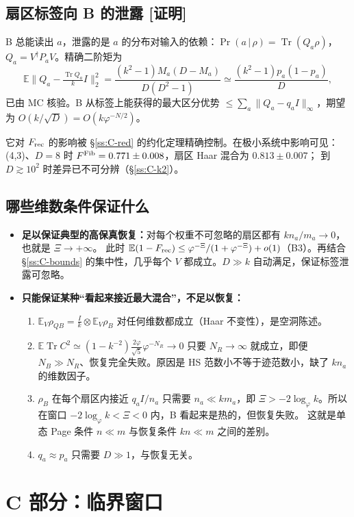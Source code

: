 \documentclass[11pt,a4paper,UTF8]{ctexart}
\newcommand{\Tr}{\operatorname{Tr}}
\newcommand{\E}{\mathbb{E}}
\newcommand{\Frec}{F_{\rm rec}}
\newcommand{\tagP}{\texorpdfstring{\textcolor{cP}{\textbf{[证明]}}}{[证明]}}
\begin{document}
\subsection{扇区标签向 B 的泄露 \tagP}\label{ss:B-leak}
B 总能读出 $a$，泄露的是 $a$ 的分布对输入的依赖：$\Pr(a\,|\,\rho)=\Tr(Q_a\rho)$，$Q_a=V^\dagger P_aV$。精确二阶矩为
\[
\E\Big\|Q_a-\tfrac{\Tr Q_a}{k}I\Big\|_2^2=\frac{(k^2-1)M_a(D-M_a)}{D(D^2-1)}\simeq\frac{(k^2-1)p_a(1-p_a)}{D},
\]
已由 MC 核验。B 从标签上能获得的最大区分优势 $\le\sum_a\|Q_a-q_aI\|_\infty$，期望为 $O(k/\sqrt D)=O(k\varphi^{-N/2})$。

它对 $\Frec$ 的影响被 \S\ref{ss:C-red} 的约化定理精确控制。在极小系统中影响可见：(4,3)、$D=8$ 时 $F^{\rm Fib}=0.771\pm0.008$，扇区 Haar 混合为 $0.813\pm0.007$；
到 $D\gtrsim10^2$ 时差异已不可分辨（\S\ref{ss:C-k2}）。

\subsection{哪些维数条件保证什么}\label{ss:B-dims}
\begin{itemize}
  \item \textbf{足以保证典型的高保真恢复：}对每个权重不可忽略的扇区都有 $kn_a/m_a\to0$，也就是 $\Xi\to+\infty$。
  此时 $\E(1-\Frec)\le\varphi^{-\Xi}/(1+\varphi^{-\Xi})+o(1)$（B3）。再结合 \S\ref{ss:C-bounds} 的集中性，几乎每个 $V$ 都成立。$D\gg k$ 自动满足，保证标签泄露可忽略。
  \item \textbf{只能保证某种“看起来接近最大混合”，不足以恢复：}
  \begin{enumerate}
    \item $\E_V\rho_{QB}=\frac Ik\otimes\E_V\rho_B$ 对任何维数都成立（Haar 不变性），是空洞陈述。
    \item $\E\Tr C^2\simeq(1-k^{-2})\frac{2\varphi}{\sqrt5}\varphi^{-N_R}\to0$ 只要 $N_R\to\infty$ 就成立，即便 $N_B\gg N_R$、恢复完全失败。原因是 HS 范数小不等于迹范数小，缺了 $kn_a$ 的维数因子。
    \item $\rho_B$ 在每个扇区内接近 $q_aI/n_a$ 只需要 $n_a\ll km_a$，即 $\Xi>-2\log_\varphi k$。所以在窗口 $-2\log_\varphi k<\Xi<0$ 内，B 看起来是热的，但恢复失败。
    这就是单态 Page 条件 $n\ll m$ 与恢复条件 $kn\ll m$ 之间的差别。
    \item $q_a\approx p_a$ 只需要 $D\gg1$，与恢复无关。
  \end{enumerate}
\end{itemize}

\section{C 部分：临界窗口}\label{sec:C}
\end{document}
